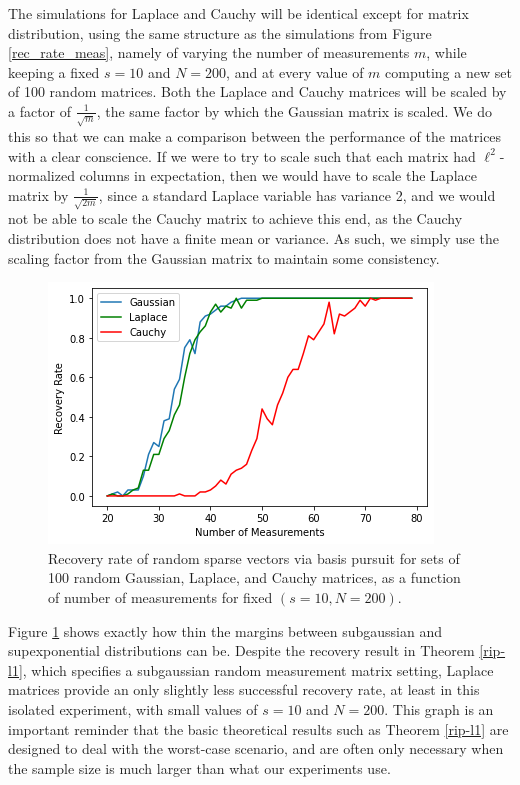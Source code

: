 \documentclass[12pt,a4paper]{amsart}
\numberwithin{equation}{section}
\theoremstyle{plain}
\theoremstyle{definition}
\begin{document}
The simulations for Laplace and Cauchy will be identical except for matrix distribution, using the same structure as the simulations from Figure \ref{rec_rate_meas}, namely of varying the number of measurements $m$, while keeping a fixed $s=10$ and $N=200$, and at every value of $m$ computing a new set of 100 random matrices. Both the Laplace and Cauchy matrices will be scaled by a factor of $\frac{1}{\sqrt{m}}$, the same factor by which the Gaussian matrix is scaled. We do this so that we can make a comparison between the performance of the matrices with a clear conscience. If we were to try to scale such that each matrix had $\ell^2$-normalized columns in expectation, then we would have to scale the Laplace matrix by $\frac{1}{\sqrt{2m}}$, since a standard Laplace variable has variance 2, and we would not be able to scale the Cauchy matrix to achieve this end, as the Cauchy distribution does not have a finite mean or variance. As such, we simply use the scaling factor from the Gaussian matrix to maintain some consistency.

\begin{figure}
    \centering
    \includegraphics[scale = 0.7]{gaussian_laplace_cauchy.png}
    \caption{Recovery rate of random sparse vectors via basis pursuit for sets of 100 random Gaussian, Laplace, and Cauchy matrices, as a function of number of measurements for fixed $(s=10,N=200)$.}
    \label{laplace_cauchy_graph}
\end{figure}

Figure \ref{laplace_cauchy_graph} shows exactly how thin the margins between subgaussian and supexponential distributions can be. Despite the recovery result in Theorem \ref{rip-l1}, which specifies a subgaussian random measurement matrix setting, Laplace matrices provide an only slightly less successful recovery rate, at least in this isolated experiment, with small values of $s=10$ and $N=200$. This graph is an important reminder that the basic theoretical results such as Theorem \ref{rip-l1} are designed to deal with the worst-case scenario, and are often only necessary when the sample size is much larger than what our experiments use.
\end{document}
